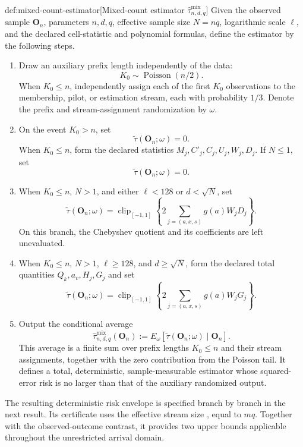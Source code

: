 \begin{algorithmv}{def:mixed-count-estimator}[Mixed-count estimator $\widehat\tau^{\mathrm{mix}}_{n,d,q}$]
Given the observed sample \(\mathbf O_n\), parameters \(n,d,q\), effective sample size \(N=nq\), logarithmic scale \(\ell\), and the declared cell-statistic and polynomial formulas, define the estimator by the following steps.
\begin{enumerate}
\item Draw an auxiliary prefix length independently of the data:
\[
K_0\sim\operatorname{Poisson}(n/2).
\]
When \(K_0\le n\), independently assign each of the first \(K_0\) observations to the membership, pilot, or estimation stream, each with probability \(1/3\). Denote the prefix and stream-assignment randomization by \(\omega\).

\item On the event \(K_0>n\), set
\[
\widetilde\tau(\mathbf O_n;\omega)=0.
\]
When \(K_0\le n\), form the declared statistics \(M_j,C'_j,C_j,U_j,W_j,D_j\). If \(N\le1\), set
\[
\widetilde\tau(\mathbf O_n;\omega)=0.
\]

\item When \(K_0\le n\), \(N>1\), and either \(\ell<128\) or \(d<\sqrt N\), set
\[
\widetilde\tau(\mathbf O_n;\omega)
=
\operatorname{clip}_{[-1,1]}
\left\{
2\sum_{j=(a,x,s)}g(a)W_jD_j
\right\}.
\]
On this branch, the Chebyshev quotient and its coefficients are left unevaluated.

\item When \(K_0\le n\), \(N>1\), \(\ell\ge128\), and \(d\ge\sqrt N\), form the declared total quantities \(Q_k,a_v,H_j,G_j\) and set
\[
\widetilde\tau(\mathbf O_n;\omega)
=
\operatorname{clip}_{[-1,1]}
\left\{
2\sum_{j=(a,x,s)}g(a)W_jG_j
\right\}.
\]

\item Output the conditional average
\[
\widehat\tau^{\mathrm{mix}}_{n,d,q}(\mathbf O_n)
:=
E_\omega\!\left[
\widetilde\tau(\mathbf O_n;\omega)\mid\mathbf O_n
\right].
\]
This average is a finite sum over prefix lengths \(K_0\le n\) and their stream assignments, together with the zero contribution from the Poisson tail. It defines a total, deterministic, sample-measurable estimator whose squared-error risk is no larger than that of the auxiliary randomized output.
\end{enumerate}
\end{algorithmv}

The resulting deterministic risk envelope  is specified branch by branch in the next result. Its certificate uses the effective stream size , equal to \(mq\). Together with the observed-outcome contrast, it provides two upper bounds applicable throughout the unrestricted arrival domain.


